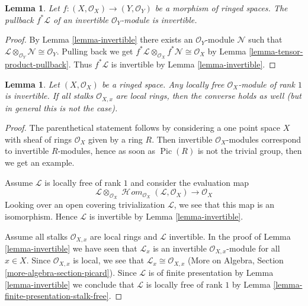 \documentclass{stacks-project}
\theoremstyle{plain}
\newtheorem{lemma}[subsection]{Lemma}
\theoremstyle{definition}
\theoremstyle{remark}
\numberwithin{equation}{subsection}
\def\SheafHom{\mathop{\mathcal{H}\!\mathit{om}}\nolimits}
\def\Pic{\mathop{\mathrm{Pic}}\nolimits}
\begin{document}
\begin{lemma}
\label{lemma-pullback-invertible}
Let $f : (X, \mathcal{O}_X) \to (Y, \mathcal{O}_Y)$ be a
morphism of ringed spaces. The pullback $f^*\mathcal{L}$ of an
invertible $\mathcal{O}_Y$-module is invertible.
\end{lemma}

\begin{proof}
By Lemma \ref{lemma-invertible}
there exists an $\mathcal{O}_Y$-module $\mathcal{N}$ such that
$\mathcal{L} \otimes_{\mathcal{O}_Y} \mathcal{N} \cong \mathcal{O}_Y$.
Pulling back we get
$f^*\mathcal{L} \otimes_{\mathcal{O}_X} f^*\mathcal{N} \cong \mathcal{O}_X$
by Lemma \ref{lemma-tensor-product-pullback}.
Thus $f^*\mathcal{L}$ is invertible by Lemma \ref{lemma-invertible}.
\end{proof}

\begin{lemma}
\label{lemma-invertible-is-locally-free-rank-1}
Let $(X, \mathcal{O}_X)$ be a ringed space. Any locally free
$\mathcal{O}_X$-module of rank $1$ is invertible.
If all stalks $\mathcal{O}_{X, x}$ are local rings, then
the converse holds as well (but in general this is not the case).
\end{lemma}

\begin{proof}
The parenthetical statement follows by considering a one point
space $X$ with sheaf of rings $\mathcal{O}_X$ given by a ring $R$.
Then invertible $\mathcal{O}_X$-modules correspond to invertible
$R$-modules, hence as soon as $\Pic(R)$ is not the trivial group,
then we get an example.

\medskip\noindent
Assume $\mathcal{L}$ is locally free of rank $1$ and consider the
evaluation map
$$
\mathcal{L} \otimes_{\mathcal{O}_X}
\SheafHom_{\mathcal{O}_X}(\mathcal{L}, \mathcal{O}_X)
\longrightarrow \mathcal{O}_X
$$
Looking over an open covering trivialization $\mathcal{L}$, we see
that this map is an isomorphism. Hence $\mathcal{L}$ is invertible
by Lemma \ref{lemma-invertible}.

\medskip\noindent
Assume all stalks $\mathcal{O}_{X, x}$ are local rings and $\mathcal{L}$
invertible. In the proof of Lemma \ref{lemma-invertible}
we have seen that $\mathcal{L}_x$ is an invertible
$\mathcal{O}_{X, x}$-module for all $x \in X$. Since
$\mathcal{O}_{X, x}$ is local, we see that
$\mathcal{L}_x \cong \mathcal{O}_{X, x}$
(More on Algebra, Section \ref{more-algebra-section-picard}).
Since $\mathcal{L}$ is of finite presentation by
Lemma \ref{lemma-invertible} we conclude that $\mathcal{L}$
is locally free of rank $1$ by
Lemma \ref{lemma-finite-presentation-stalk-free}.
\end{proof}
\end{document}
